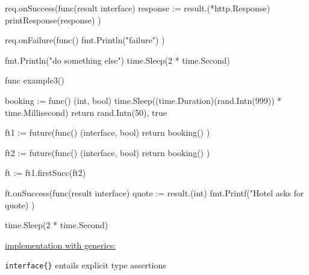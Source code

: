 \documentclass[landscape, a4paper]{article}
\begin{document}
\begin{minipage}[t]{0.2\linewidth}
\begin{betterlist}
{\begin{dnumberedcodebox}[minted language=go,minted options={autogobble, fontsize=\tiny,numbersep=0.3cm,linenos}, box align=top]
{              req.onSuccess(func(result interface{}) {
                  response := result.(*http.Response)
                  printResponse(response)
              })

              req.onFailure(func() {
                  fmt.Println("failure")
              })

              fmt.Println("do something else")
              time.Sleep(2 * time.Second)
          }

          func example3() {
              booking := func() (int, bool) {
                  time.Sleep((time.Duration)(rand.Intn(999)) 
                    * time.Millisecond)
                  return rand.Intn(50), true
              }

              ft1 := future(func() (interface{}, bool) {
                  return booking()
              })

              ft2 := future(func() (interface{}, bool) {
                  return booking()
              })

              ft := ft1.firstSucc(ft2)

              ft.onSuccess(func(result interface{}) {
                  quote := result.(int)
                  fmt.Printf("Hotel asks for %
                    quote)
              })

              time.Sleep(2 * time.Second)
          }
          \end{dnumberedcodebox}
      }
		\item \underline{implementation with generics:}
		\begin{betterlist}
			\item \verb|interface{}| entails explicit type assertions
		\end{betterlist}
\end{betterlist}
\end{minipage}
\end{document}
